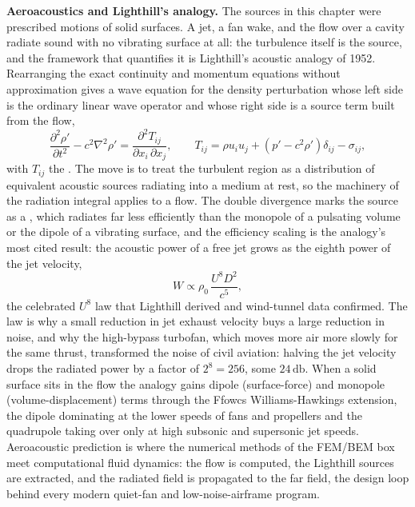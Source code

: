 \begin{mastery}
\textbf{Aeroacoustics and Lighthill's analogy.} The sources in this chapter
were prescribed motions of solid surfaces. A jet, a fan wake, and the flow
over a cavity radiate sound with no vibrating surface at all: the turbulence
itself is the source, and the framework that quantifies it is Lighthill's
acoustic analogy of 1952. Rearranging the exact continuity and momentum
equations without approximation gives a wave equation for the density
perturbation whose left side is the ordinary linear wave operator and whose
right side is a source term built from the flow,
\[
\frac{\partial^2\rho'}{\partial t^2} - c^2\nabla^2\rho'
= \frac{\partial^2 T_{ij}}{\partial x_i\,\partial x_j},
\qquad
T_{ij} = \rho u_i u_j + (p'-c^2\rho')\delta_{ij} - \sigma_{ij},
\]
with $T_{ij}$ the . The move is to treat the
turbulent region as a distribution of equivalent acoustic sources radiating
into a medium at rest, so the machinery of the radiation integral applies to
a flow. The double divergence marks the source as a ,
which radiates far less efficiently than the monopole of a pulsating volume
or the dipole of a vibrating surface, and the efficiency scaling is the
analogy's most cited result: the acoustic power of a free jet grows as the
eighth power of the jet velocity,
\[
W \propto \rho_0\,\frac{U^8 D^2}{c^5},
\]
the celebrated $U^8$ law that Lighthill derived and wind-tunnel data
confirmed. The law is why a small reduction in jet exhaust velocity buys a
large reduction in noise, and why the high-bypass turbofan, which moves more
air more slowly for the same thrust, transformed the noise of civil aviation:
halving the jet velocity drops the radiated power by a factor of
$2^8 = 256$, some $24\,\si{\decibel}$. When a solid surface sits in the flow
the analogy gains dipole (surface-force) and monopole (volume-displacement)
terms through the Ffowcs Williams-Hawkings extension, the dipole dominating
at the lower speeds of fans and propellers and the quadrupole taking over
only at high subsonic and supersonic jet speeds. Aeroacoustic prediction is
where the numerical methods of the FEM/BEM box meet computational fluid
dynamics: the flow is computed, the Lighthill sources are extracted, and the
radiated field is propagated to the far field, the design loop behind every
modern quiet-fan and low-noise-airframe program.
\end{mastery}

